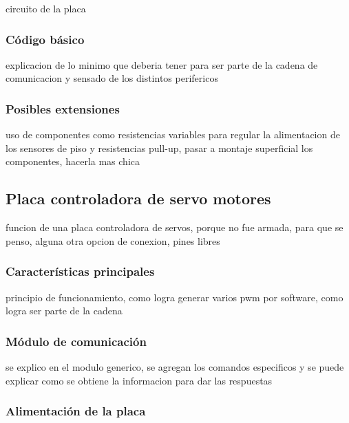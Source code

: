 circuito de la placa

\subsubsection{C\'odigo b\'asico}
\label{h_placas_sensado_codigo}

explicacion de lo minimo que deberia tener para ser parte de la cadena de comunicacion y sensado de los distintos perifericos

\subsubsection{Posibles extensiones}
\label{h_placas_sensado_extensiones}

uso de componentes como resistencias variables para regular la alimentacion de los sensores de piso y resistencias pull-up, pasar a montaje superficial los componentes, hacerla mas chica

\subsection{Placa controladora de servo motores}
\label{h_placas_servos}

funcion de una placa controladora de servos, porque no fue armada, para que se penso, alguna otra opcion de conexion, pines libres

\subsubsection{Caracter\'isticas principales}
\label{h_placas_servos_caracteristicas}

principio de funcionamiento, como logra generar varios pwm por software, como logra ser parte de la cadena

\subsubsection{M\'odulo de comunicaci\'on}
\label{h_placas_servos_comm}

se explico en el modulo generico, se agregan los comandos especificos y se puede explicar como se obtiene la informacion para dar las respuestas

\subsubsection{Alimentaci\'on de la placa}
\label{h_placas_servos_alimentacion}

